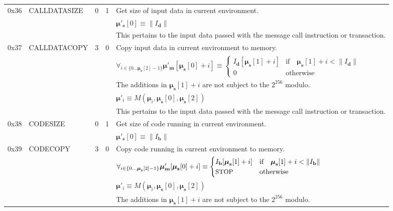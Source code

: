 \documentclass[9pt,oneside]{amsart}
\begin{document}
\begin{tabular*}{\columnwidth}[h]{rlrrl}
\midrule
0x36 & {\small CALLDATASIZE} & 0 & 1 & Get size of input data in current environment. \\
&&&& $\boldsymbol{\mu}'_\mathbf{s}[0] \equiv \lVert I_\mathbf{d} \rVert$ \\
&&&& This pertains to the input data passed with the message call instruction or transaction. \\
\midrule
0x37 & {\small CALLDATACOPY} & 3 & 0 & Copy input data in current environment to memory. \\
&&&& $\forall_{i \in \{ 0 \dots \boldsymbol{\mu}_\mathbf{s}[2] - 1\} } \boldsymbol{\mu}'_\mathbf{m}[\boldsymbol{\mu}_\mathbf{s}[0] + i ] \equiv
\begin{cases} I_\mathbf{d}[\boldsymbol{\mu}_\mathbf{s}[1] + i] & \text{if} \quad \boldsymbol{\mu}_\mathbf{s}[1] + i < \lVert I_\mathbf{d} \rVert \\ 0 & \text{otherwise} \end{cases}$\\
&&&& The additions in $\boldsymbol{\mu}_\mathbf{s}[1] + i$ are not subject to the $2^{256}$ modulo. \\
&&&& $\boldsymbol{\mu}'_i \equiv M(\boldsymbol{\mu}_i, \boldsymbol{\mu}_\mathbf{s}[0], \boldsymbol{\mu}_\mathbf{s}[2])$ \\
&&&& This pertains to the input data passed with the message call instruction or transaction. \\
\midrule
0x38 & {\small CODESIZE} & 0 & 1 & Get size of code running in current environment. \\
&&&& $\boldsymbol{\mu}'_\mathbf{s}[0] \equiv \lVert I_\mathbf{b} \rVert$ \\
\midrule
0x39 & {\small CODECOPY} & 3 & 0 & Copy code running in current environment to memory. \\
&&&& $\forall_{i \in \{ 0 \dots \boldsymbol{\mu}_\mathbf{s}[2] - 1\} } \boldsymbol{\mu}'_\mathbf{m}[\boldsymbol{\mu}_\mathbf{s}[0] + i ] \equiv
\begin{cases} I_\mathbf{b}[\boldsymbol{\mu}_\mathbf{s}[1] + i] & \text{if} \quad \boldsymbol{\mu}_\mathbf{s}[1] + i < \lVert I_\mathbf{b} \rVert \\ \text{\small STOP} & \text{otherwise} \end{cases}$\\
&&&& $\boldsymbol{\mu}'_i \equiv M(\boldsymbol{\mu}_i, \boldsymbol{\mu}_\mathbf{s}[0], \boldsymbol{\mu}_\mathbf{s}[2])$ \\
&&&& The additions in $\boldsymbol{\mu}_\mathbf{s}[1] + i$ are not subject to the $2^{256}$ modulo. \\

\end{tabular*}
\end{document}
